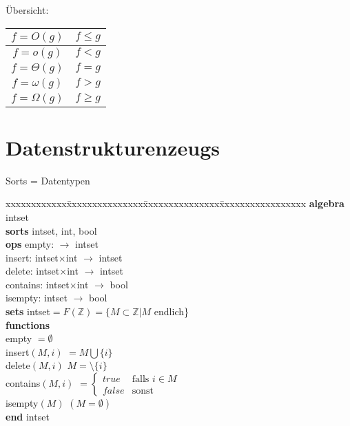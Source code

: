 \documentclass[12pt, twoside]{article}
\begin{document}
Übersicht: \\

\begin{tabular}{| c |  c |}
\hline
$f=O(g)$  & $f \le g $ \\
\hline
$f=o(g)$ & $f < g$ \\
\hline
$f=\Theta(g)$ & $f=g$ \\
\hline
$f=\omega(g)$ & $f>g$ \\
\hline
$f=\Omega(g)$ & $f\ge g$ \\
\hline
\end{tabular}



\section{Datenstrukturenzeugs}

Sorts = Datentypen


\begin{tabbing}
xxxxxxxxxxxx\=xxxxxxxxxxxxxxx\=xxxxxxxxxxxxxxx\=xxxxxxxxxxxxxxxxx\kill
\textbf{algebra}    \> intset \> \> \\
\textbf{sorts}      \> intset, int, bool \> \> \\
\textbf{ops}   \> empty: \>           \> $\to$ intset   \\
  \> insert:   \> intset$\times$int \> $\to$ intset \\
  \> delete:   \> intset$\times$int \> $\to$ intset \\
  \> contains: \> intset$\times$int \> $\to$ bool   \\
  \> isempty:  \> intset            \> $\to$ bool   \\
\textbf{sets}  \> intset$=F( \mathbb{Z} )=\{M \subset \mathbb{Z}|M$  endlich\} \> \> \\ 
\textbf{functions} \\
 \> empty \> \> $=\emptyset$ \\
 \> insert$(M, i)$ \> \> $=M\bigcup\{i\}$ \\
 \> delete$(M,i)$ \> \> $M=\setminus \{i\}$ \\
 \> contains$(M,i)$ \> \> $
   =
   \begin{cases}
     true  & \text{falls } i \in M \\
     false    &  \text{sonst} 
   \end{cases}
$\\
 \> isempty$(M)$ \> \> $(M= \emptyset )$ \\
\textbf{end} intset \\
\end{tabbing}
\end{document}
